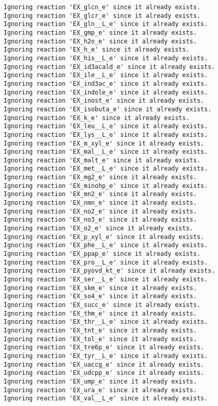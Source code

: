 \documentclass[
  letterpaper,
  DIV=11,
  numbers=noendperiod]{scrartcl}
\begin{document}
\begin{verbatim}
Ignoring reaction 'EX_glcn_e' since it already exists.
Ignoring reaction 'EX_glcr_e' since it already exists.
Ignoring reaction 'EX_gln__L_e' since it already exists.
Ignoring reaction 'EX_gmp_e' since it already exists.
Ignoring reaction 'EX_h2o_e' since it already exists.
Ignoring reaction 'EX_h_e' since it already exists.
Ignoring reaction 'EX_his__L_e' since it already exists.
Ignoring reaction 'EX_id3acald_e' since it already exists.
Ignoring reaction 'EX_ile__L_e' since it already exists.
Ignoring reaction 'EX_ind3ac_e' since it already exists.
Ignoring reaction 'EX_indole_e' since it already exists.
Ignoring reaction 'EX_inost_e' since it already exists.
Ignoring reaction 'EX_isobuta_e' since it already exists.
Ignoring reaction 'EX_k_e' since it already exists.
Ignoring reaction 'EX_leu__L_e' since it already exists.
Ignoring reaction 'EX_lys__L_e' since it already exists.
Ignoring reaction 'EX_m_xyl_e' since it already exists.
Ignoring reaction 'EX_mal__L_e' since it already exists.
Ignoring reaction 'EX_malt_e' since it already exists.
Ignoring reaction 'EX_met__L_e' since it already exists.
Ignoring reaction 'EX_mg2_e' since it already exists.
Ignoring reaction 'EX_minohp_e' since it already exists.
Ignoring reaction 'EX_mn2_e' since it already exists.
Ignoring reaction 'EX_nmn_e' since it already exists.
Ignoring reaction 'EX_no2_e' since it already exists.
Ignoring reaction 'EX_no3_e' since it already exists.
Ignoring reaction 'EX_o2_e' since it already exists.
Ignoring reaction 'EX_p_xyl_e' since it already exists.
Ignoring reaction 'EX_phe__L_e' since it already exists.
Ignoring reaction 'EX_ppap_e' since it already exists.
Ignoring reaction 'EX_pro__L_e' since it already exists.
Ignoring reaction 'EX_pyovd_kt_e' since it already exists.
Ignoring reaction 'EX_ser__L_e' since it already exists.
Ignoring reaction 'EX_skm_e' since it already exists.
Ignoring reaction 'EX_so4_e' since it already exists.
Ignoring reaction 'EX_succ_e' since it already exists.
Ignoring reaction 'EX_thm_e' since it already exists.
Ignoring reaction 'EX_thr__L_e' since it already exists.
Ignoring reaction 'EX_tnt_e' since it already exists.
Ignoring reaction 'EX_tol_e' since it already exists.
Ignoring reaction 'EX_tre6p_e' since it already exists.
Ignoring reaction 'EX_tyr__L_e' since it already exists.
Ignoring reaction 'EX_uaccg_e' since it already exists.
Ignoring reaction 'EX_udcpp_e' since it already exists.
Ignoring reaction 'EX_ump_e' since it already exists.
Ignoring reaction 'EX_ura_e' since it already exists.
Ignoring reaction 'EX_val__L_e' since it already exists.

\end{verbatim}
\end{document}
